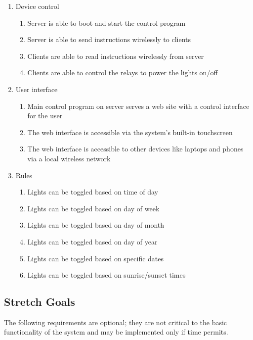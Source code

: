 \documentclass[12pt]{article}
\begin{document}
\begin{enumerate}
    \item Device control
        \begin{enumerate}
            \item Server is able to boot and start the control program
            \item Server is able to send instructions wirelessly to clients
            \item Clients are able to read instructions wirelessly from server
            \item Clients are able to control the relays to power the lights on/off
        \end{enumerate}

    \item User interface
        \begin{enumerate}
            \item Main control program on server serves a web site with a control interface for the user
            \item The web interface is accessible via the system's built-in touchscreen
            \item The web interface is accessible to other devices like laptops and phones via a local wireless network
        \end{enumerate}

    \item Rules
        \begin{enumerate}
            \item Lights can be toggled based on time of day
            \item Lights can be toggled based on day of week
            \item Lights can be toggled based on day of month
            \item Lights can be toggled based on day of year
            \item Lights can be toggled based on specific dates
            \item Lights can be toggled based on sunrise/sunset times
        \end{enumerate}
\end{enumerate}

\subsection{Stretch Goals}

The following requirements are optional; they are not critical to the basic
functionality of the system and may be implemented only if time permits.
\end{document}
